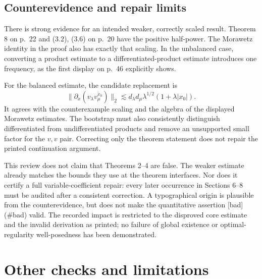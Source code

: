 \documentclass[10pt]{article}
\begin{document}
\subsection*{Counterevidence and repair limits}
There is strong evidence for an intended weaker, correctly scaled result. Theorem 8 on p. 22 and (3.2), (3.6) on p. 20 have the positive half-power. The Morawetz identity in the proof also has exactly that scaling. In the unbalanced case, converting a product estimate to a differentiated-product estimate introduces one frequency, as the first display on p. 46 explicitly shows.\par
For the balanced estimate, the candidate replacement is \[\|\partial_x(v_\lambda\overline{v_\mu^{x_0}})\|_2
 \lesssim d_\lambda d_\mu\lambda^{1/2}(1+\lambda|x_0|).\] It agrees with the counterexample scaling and the algebra of the displayed Morawetz estimates. The bootstrap must also consistently distinguish differentiated from undifferentiated products and remove an unsupported small factor for the \(v,v\) pair. Correcting only the theorem statement does not repair the printed continuation argument.\par
This review does not claim that Theorems 2–4 are false. The weaker estimate already matches the bounds they use at the theorem interfaces. Nor does it certify a full variable-coefficient repair: every later occurrence in Sections 6–8 must be audited after a consistent correction. A typographical origin is plausible from the counterevidence, but does not make the quantitative assertion [bad] (\#bad) valid. The recorded impact is restricted to the disproved core estimate and the invalid derivation as printed; no failure of global existence or optimal-regularity well-posedness has been demonstrated.\par
\section*{Other checks and limitations}
\end{document}
